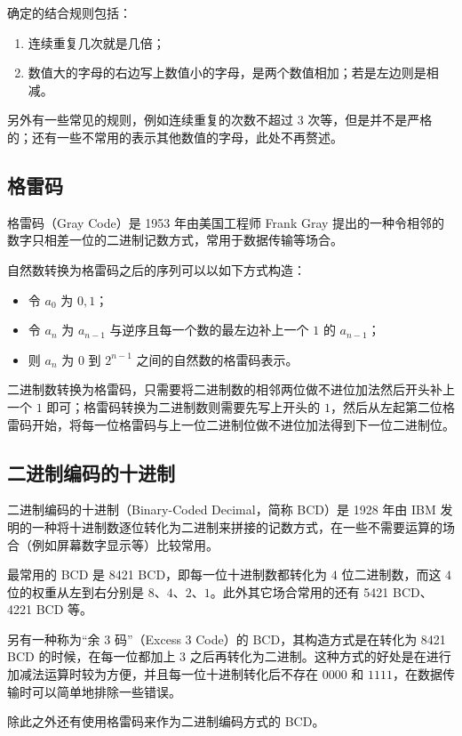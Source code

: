         确定的结合规则包括：
        \begin{enumerate}
            \item 连续重复几次就是几倍；
            \item 数值大的字母的右边写上数值小的字母，是两个数值相加；若是左边则是相减。
        \end{enumerate}

        另外有一些常见的规则，例如连续重复的次数不超过 3 次等，但是并不是严格的；还有一些不常用的表示其他数值的字母，此处不再赘述。

    \subsection{格雷码}\label{subsec:NumberSystemBasics/NonPositional/GrayCode}
        格雷码（Gray Code）是 1953 年由美国工程师 Frank Gray 提出的一种令相邻的数字只相差一位的二进制记数方式，常用于数据传输等场合。

        自然数转换为格雷码之后的序列可以以如下方式构造：
        \begin{itemize}
            \item 令 $a_0$ 为 ${0, 1}$；
            \item 令 $a_n$ 为 $a_{n-1}$ 与逆序且每一个数的最左边补上一个 $1$ 的 $a_{n-1}$；
            \item 则 $a_n$ 为 $0$ 到 $2^{n-1}$ 之间的自然数的格雷码表示。
        \end{itemize}

        二进制数转换为格雷码，只需要将二进制数的相邻两位做不进位加法然后开头补上一个 $1$ 即可；格雷码转换为二进制数则需要先写上开头的 $1$，然后从左起第二位格雷码开始，将每一位格雷码与上一位二进制位做不进位加法得到下一位二进制位。

    \subsection{二进制编码的十进制}\label{subsec:NumberSystemBasics/NonPositional/BinaryCodedDecimal}
        二进制编码的十进制（Binary-Coded Decimal，简称 BCD）是 1928 年由 IBM 发明的一种将十进制数逐位转化为二进制来拼接的记数方式，在一些不需要运算的场合（例如屏幕数字显示等）比较常用。

        最常用的 BCD 是 8421 BCD，即每一位十进制数都转化为 $4$ 位二进制数，而这 $4$ 位的权重从左到右分别是 $8$、$4$、$2$、$1$。此外其它场合常用的还有 5421 BCD、4221 BCD 等。

        另有一种称为“余 3 码”（Excess 3 Code）的 BCD，其构造方式是在转化为 8421 BCD 的时候，在每一位都加上 $3$ 之后再转化为二进制。这种方式的好处是在进行加减法运算时较为方便，并且每一位十进制转化后不存在 $0000$ 和 $1111$，在数据传输时可以简单地排除一些错误。

        除此之外还有使用格雷码来作为二进制编码方式的 BCD。
